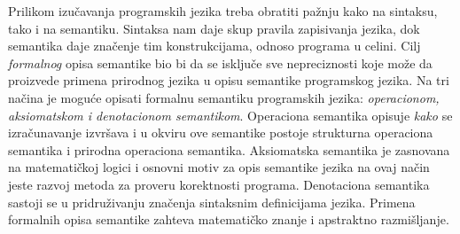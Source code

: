 \documentclass[a4paper]{article}
\begin{document}
Prilikom izučavanja programskih jezika treba obratiti pažnju kako na sintaksu, tako i na semantiku. Sintaksa nam daje skup pravila zapisivanja jezika, dok semantika daje značenje tim konstrukcijama, odnoso programa u celini. Cilj \textit{formalnog} opisa semantike bio bi da se isključe sve nepreciznosti koje može da proizvede primena prirodnog jezika u opisu semantike programskog jezika. Na tri načina je moguće opisati formalnu semantiku programskih jezika: \textit{operacionom, aksiomatskom  i  denotacionom semantikom}. Operaciona semantika opisuje \textit{kako} se izračunavanje izvršava i u okviru ove semantike postoje strukturna operaciona semantika i prirodna operaciona semantika. Aksiomatska semantika je zasnovana na matematičkoj logici i osnovni motiv za opis semantike jezika na ovaj način jeste razvoj metoda za proveru korektnosti programa. Denotaciona semantika sastoji se u pridruživanju značenja sintaksnim definicijama jezika. Primena formalnih opisa semantike zahteva matematičko znanje i apstraktno razmišljanje.


\appendix



\appendix
\end{document}
